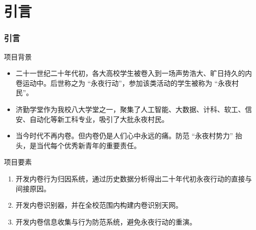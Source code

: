 %
%
% 
%
\section{引言}
    \begin{frame}
    \frametitle{引言}
        \footnotesize
        \begin{block}{项目背景}
            \begin{itemize}
                \item 二十一世纪二十年代初，各大高校学生被卷入到一场声势浩大、旷日持久的内卷运动中。后世称之为 “永夜行动”，参加该类活动的学生被称为 “永夜村民”。
                \item 济勤学堂作为我校八大学堂之一，聚集了人工智能、大数据、计科、软工、信安、自动化等新工科专业，吸引了大批永夜村民。
                \item 当今时代不再内卷。但内卷仍是人们心中永远的痛。防范 “永夜村势力” 抬头，是当代每个优秀新青年的重要责任。
            \end{itemize}
        \end{block}
        
        \begin{block}{项目要素}
            \begin{enumerate}
                \item 开发内卷行为归因系统，通过历史数据分析得出二十年代初永夜行动的直接与间接原因。
                \item 开发内卷识别器，并在全校范围内构建内卷识别天网。
                \item 开发内卷信息收集与行为防范系统，避免永夜行动的重演。
            \end{enumerate}
        \end{block}
    \end{frame}

